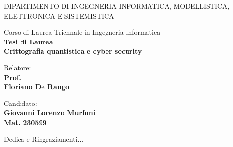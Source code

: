 \documentclass[a4paper,12pt,oneside]{book} %
\newenvironment{dedication}
  {\clearpage           %
   \thispagestyle{empty}%
   \vspace*{\stretch{1}}%
   \itshape             %
   \raggedleft          %
  }
   {\par %
   \vspace{\stretch{3}} %
   \clearpage           %
  }
\begin{document}
\begin{titlepage}
    \begin{center}
    \vspace*{0.2cm}
    \begin{figure}[H]
        \centering
    \end{figure}
        \vspace{5mm}
    	\uppercase{\normalsize Dipartimento di Ingegneria Informatica, Modellistica, Elettronica e Sistemistica}\\
    \end{center}
    \begin{center}
    	\large{ Corso di Laurea Triennale in Ingegneria Informatica}\\
        \vspace{3mm}
        \large{\bf Tesi di Laurea}\\
    	\vspace{10mm}
    {\LARGE{\bf Crittografia quantistica e cyber security}}\\	
     \vspace{7mm}
    \end{center}
    
    \vspace{25mm}
    \noindent
    \begin{minipage}[t]{0.47\textwidth}
    	{\large{ Relatore:\vspace*{0.22cm}\\\bf Prof. \\Floriano De Rango}}
    	\vspace{12mm}
    \end{minipage}
    \hfill
    \begin{minipage}[t]{0.4\textwidth}\raggedleft
    	{\large{Candidato: \\ \bf Giovanni Lorenzo Murfuni\\ Mat. 230599}}
    \end{minipage}
    
    \vspace{30mm}
    

\end{titlepage}

\begin{dedication}
Dedica e Ringraziamenti...
\end{dedication}




\tableofcontents







\printbibliography

\end{document}
